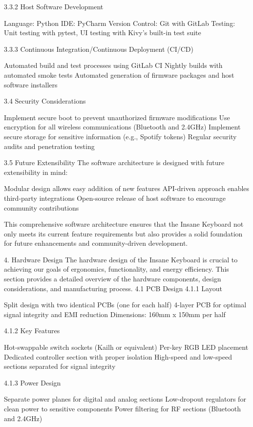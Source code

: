 \documentclass[a4paper,11pt]{article}%
\begin{document}
3.3.2 Host Software Development

Language: Python
IDE: PyCharm
Version Control: Git with GitLab
Testing: Unit testing with pytest, UI testing with Kivy's built-in test suite

3.3.3 Continuous Integration/Continuous Deployment (CI/CD)

Automated build and test processes using GitLab CI
Nightly builds with automated smoke tests
Automated generation of firmware packages and host software installers

3.4 Security Considerations

Implement secure boot to prevent unauthorized firmware modifications
Use encryption for all wireless communications (Bluetooth and 2.4GHz)
Implement secure storage for sensitive information (e.g., Spotify tokens)
Regular security audits and penetration testing

3.5 Future Extensibility
The software architecture is designed with future extensibility in mind:

Modular design allows easy addition of new features
API-driven approach enables third-party integrations
Open-source release of host software to encourage community contributions

This comprehensive software architecture ensures that the Insane Keyboard not only meets its current feature requirements but also provides a solid foundation for future enhancements and community-driven development.


4. Hardware Design
The hardware design of the Insane Keyboard is crucial to achieving our goals of ergonomics, functionality, and energy efficiency. This section provides a detailed overview of the hardware components, design considerations, and manufacturing process.
4.1 PCB Design
4.1.1 Layout

Split design with two identical PCBs (one for each half)
4-layer PCB for optimal signal integrity and EMI reduction
Dimensions: 160mm x 150mm per half

4.1.2 Key Features

Hot-swappable switch sockets (Kailh or equivalent)
Per-key RGB LED placement
Dedicated controller section with proper isolation
High-speed and low-speed sections separated for signal integrity

4.1.3 Power Design

Separate power planes for digital and analog sections
Low-dropout regulators for clean power to sensitive components
Power filtering for RF sections (Bluetooth and 2.4GHz)
\end{document}

